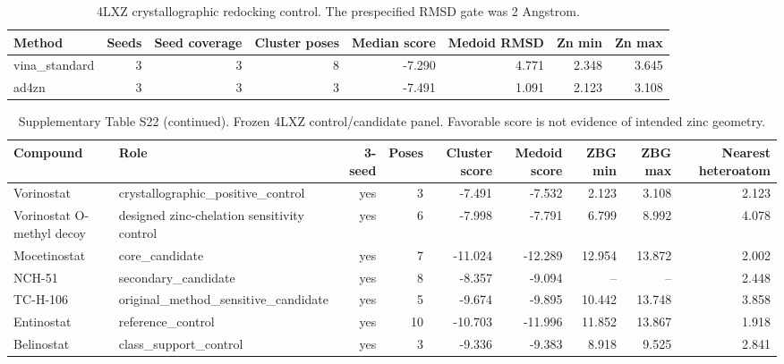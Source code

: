 \begingroup
\footnotesize
\begin{table}[H]
\centering
\caption{4LXZ crystallographic redocking control. The prespecified RMSD gate was 2 Angstrom.}
\label{tab:s_redock}
\begin{tabular}{@{}lrrrrrrr@{}}
\toprule
Method & Seeds & Seed coverage & Cluster poses & Median score & Medoid RMSD & Zn min & Zn max \\
\midrule
vina\_standard & 3 & 3 & 8 & -7.290 & 4.771 & 2.348 & 3.645 \\
ad4zn & 3 & 3 & 3 & -7.491 & 1.091 & 2.123 & 3.108 \\
\bottomrule
\end{tabular}
\end{table}
\endgroup
\begingroup
\scriptsize
\begin{table}[H]
\centering
\caption*{Supplementary Table S22 (continued). Frozen 4LXZ control/candidate panel. Favorable score is not evidence of intended zinc geometry.}
\begin{tabular}{@{}p{3.2cm}p{6.0cm}rrrrrrr@{}}
\toprule
Compound & Role & 3-seed & Poses & Cluster score & Medoid score & ZBG min & ZBG max & Nearest heteroatom \\
\midrule
Vorinostat & crystallographic\_positive\_control & yes & 3 & -7.491 & -7.532 & 2.123 & 3.108 & 2.123 \\
Vorinostat O-methyl decoy & designed zinc-chelation sensitivity control & yes & 6 & -7.998 & -7.791 & 6.799 & 8.992 & 4.078 \\
Mocetinostat & core\_candidate & yes & 7 & -11.024 & -12.289 & 12.954 & 13.872 & 2.002 \\
NCH-51 & secondary\_candidate & yes & 8 & -8.357 & -9.094 & -- & -- & 2.448 \\
TC-H-106 & original\_method\_sensitive\_candidate & yes & 5 & -9.674 & -9.895 & 10.442 & 13.748 & 3.858 \\
Entinostat & reference\_control & yes & 10 & -10.703 & -11.996 & 11.852 & 13.867 & 1.918 \\
Belinostat & class\_support\_control & yes & 3 & -9.336 & -9.383 & 8.918 & 9.525 & 2.841 \\
\bottomrule
\end{tabular}
\end{table}
\endgroup
\begingroup
\footnotesize
